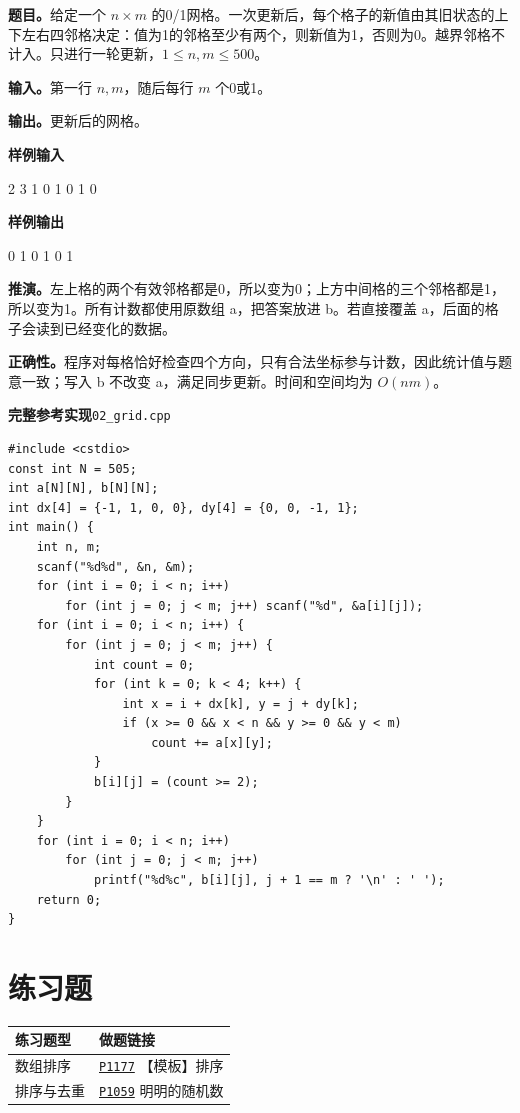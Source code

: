 \documentclass[UTF8,11pt,a4paper,fontset=none]{ctexart}
\newcommand{\prob}[1]{\href{https://www.luogu.com.cn/problem/#1}{\texttt{#1}}}
\begin{document}
\noindent\textbf{题目。}给定一个 $n\times m$ 的0/1网格。一次更新后，每个格子的新值由其旧状态的上下左右四邻格决定：值为1的邻格至少有两个，则新值为1，否则为0。越界邻格不计入。只进行一轮更新，$1\le n,m\le500$。

\noindent\textbf{输入。}第一行 $n,m$，随后每行 $m$ 个0或1。

\noindent\textbf{输出。}更新后的网格。
\begin{tcolorbox}[samplebox,title={输入输出样例}]
\textbf{样例输入}
\begin{Sample}
2 3
1 0 1
0 1 0
\end{Sample}
\tcblower
\textbf{样例输出}
\begin{Sample}
0 1 0
1 0 1
\end{Sample}
\end{tcolorbox}

\noindent\textbf{推演。}左上格的两个有效邻格都是0，所以变为0；上方中间格的三个邻格都是1，所以变为1。所有计数都使用原数组 a，把答案放进 b。若直接覆盖 a，后面的格子会读到已经变化的数据。

\noindent\textbf{正确性。}程序对每格恰好检查四个方向，只有合法坐标参与计数，因此统计值与题意一致；写入 b 不改变 a，满足同步更新。时间和空间均为 $O(nm)$。
\par\noindent\begin{minipage}{\linewidth}
\textbf{完整参考实现}\quad\texttt{02\_grid.cpp}
\begin{lstlisting}
#include <cstdio>
const int N = 505;
int a[N][N], b[N][N];
int dx[4] = {-1, 1, 0, 0}, dy[4] = {0, 0, -1, 1};
int main() {
    int n, m;
    scanf("%d%d", &n, &m);
    for (int i = 0; i < n; i++)
        for (int j = 0; j < m; j++) scanf("%d", &a[i][j]);
    for (int i = 0; i < n; i++) {
        for (int j = 0; j < m; j++) {
            int count = 0;
            for (int k = 0; k < 4; k++) {
                int x = i + dx[k], y = j + dy[k];
                if (x >= 0 && x < n && y >= 0 && y < m)
                    count += a[x][y];
            }
            b[i][j] = (count >= 2);
        }
    }
    for (int i = 0; i < n; i++)
        for (int j = 0; j < m; j++)
            printf("%d%c", b[i][j], j + 1 == m ? '\n' : ' ');
    return 0;
}
\end{lstlisting}
\end{minipage}\par


\section{练习题}
\begin{longtable}{P{5cm}P{9cm}}
\toprule 练习题型 & 做题链接\\\midrule
数组排序 & \prob{P1177} 【模板】排序\\
排序与去重 & \prob{P1059} 明明的随机数\\
\bottomrule\end{longtable}
\end{document}
